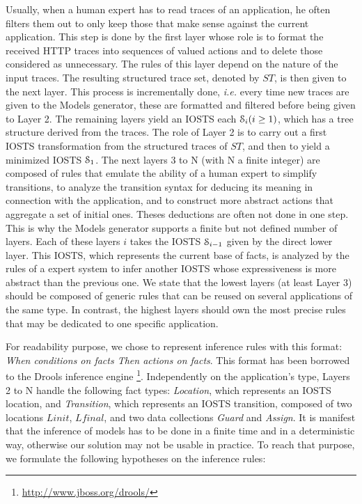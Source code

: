 Usually, when a human expert has to read traces of an
application, he often filters them out to only keep those that
make sense against the current application. This step is done by
the first layer whose role is to format the received HTTP traces
into sequences of valued actions and to delete those considered
as unnecessary. The rules of this layer depend on the nature of
the input traces. The resulting structured trace set, denoted by
$ST$, is then given to the next layer. This process is
incrementally done, \emph{i.e.} every time new traces are given to the
Models generator, these are formatted and filtered before being
given to Layer 2. The remaining layers yield an IOSTS each
$\EuScript{S}_i (i\geq 1)$, which has a tree structure derived
from the traces. The role of Layer 2 is to carry out a first
IOSTS transformation from the structured traces of $ST$, and then
to yield a minimized IOSTS $\EuScript{S}_1$. The next layers
3 to N (with N a finite integer) are composed of rules that
emulate the ability of a human expert to simplify transitions, to
analyze the transition syntax for deducing its meaning in
connection with the application, and to construct more abstract
actions that aggregate a set of initial ones. Theses deductions
are often not done in one step. This is why the Models generator
supports a finite but not defined number of layers.  Each of
these layers $i$ takes the IOSTS $\EuScript{S}_{i-1}$ given by
the direct lower layer. This IOSTS, which represents the current
base of facts, is analyzed by the rules of a expert system to
infer another IOSTS whose expressiveness is more abstract than
the previous one. We state that the lowest layers (at least Layer
3) should be composed of generic rules that can be reused on
several applications of the same type. In contrast, the highest
layers should own the most precise rules that may be dedicated to
one specific application.

For readability purpose, we chose to represent inference rules
with this format: \textit{When conditions on facts Then actions
on facts}. This format has been borrowed to the Drools inference
engine \footnote{\url{http://www.jboss.org/drools/}}.
Independently on the application's type, Layers 2 to N handle the
following fact types: \textit{Location}, which represents an
IOSTS location, and \textit{Transition}, which represents an
IOSTS transition, composed of two locations $Linit$, $Lfinal$,
and two data collections \textit{Guard} and \textit{Assign}. It
is manifest that the inference of models has to be done in a
finite time and in a deterministic way, otherwise our solution
may not be usable in practice. To reach that purpose, we
formulate the following hypotheses on the inference rules:

